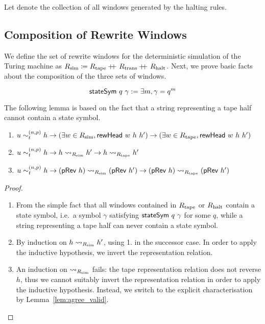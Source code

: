 \begin{center}
  \quad {}
  \quad {}
\end{center}

Let \mnotec{$\Rhalt$} denote the collection of all windows generated by the halting rules.

\subsection{Composition of Rewrite Windows}
We define the set of rewrite windows \mnotec{$\Rsim$} for the deterministic simulation of the Turing machine as $R_{\text{sim}} \coloneqq R_{\text{tape}} +\kern-1.3ex+\kern0.8ex R_{\text{trans}} +\kern-1.3ex+\kern0.8ex R_{\text{halt}}$.
Next, we prove basic facts about the composition of the three sets of windows. 

\begin{definition}
  \[\textsf{stateSym}~q~\gamma := \exists m, \gamma = q^m \]
\end{definition}

The following lemma is based on the fact that a string representing a tape half cannot contain a state symbol.
\begin{lemma}\leavevmode
  \begin{enumerate}
    \item $u \sim_t^{(n, p)} h \rightarrow (\exists w \in R_{\text{sim}}, \textsf{rewHead}~w~h~h') \rightarrow (\exists w \in R_{\text{tape}}, \textsf{rewHead}~w~h~h')$
    \item $u \sim_t^{(n, p)} h \rightarrow h \rightsquigarrow_{R_{\text{sim}}} h' \rightarrow h \rightsquigarrow_{R_{\text{tape}}} h'$
    \item $u \sim_t^{(n, p)} h \rightarrow (\textsf{pRev}~{h}) \rightsquigarrow_{R_{\text{sim}}} (\textsf{pRev}~{h'}) \rightarrow (\textsf{pRev}~{h}) \rightsquigarrow_{R_{\text{tape}}} (\textsf{pRev}~{h'})$
  \end{enumerate}
\end{lemma}
\begin{proof}
  \begin{enumerate}
    \item From the simple fact that all windows contained in $R_{\text{tape}}$ or $\Rhalt$ contain a state symbol, i.e.\ a symbol $\gamma$ satisfying $\textsf{stateSym}~q~\gamma$ for some $q$, while a string representing a tape half can never contain a state symbol.
    \item By induction on $h \rightsquigarrow_{R_{\text{sim}}} h'$, using 1. in the successor case. In order to apply the inductive hypothesis, we invert the representation relation.
    \item An induction on $\rightsquigarrow_{R_{\text{sim}}}$ fails: the tape representation relation does not reverse $h$, thus we cannot suitably invert the representation relation in order to apply the inductive hypothesis. Instead, we switch to the explicit characterisation by Lemma~\ref{lem:agree_valid}.
  \end{enumerate}
\end{proof}


